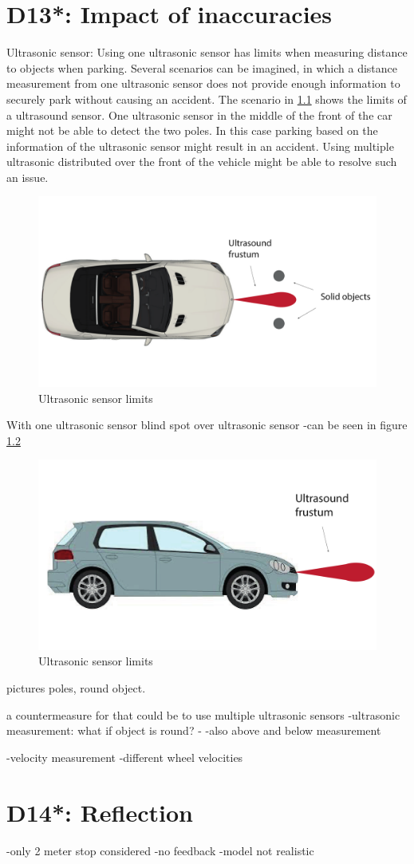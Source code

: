 \chapter{D13*: Impact of inaccuracies}\label{cha:D13}
Ultrasonic sensor:
Using one ultrasonic sensor has limits when measuring distance to objects when parking.
Several scenarios can be imagined, in which a distance measurement from one ultrasonic sensor does not provide enough information to securely park without causing an accident.
The scenario in \ref{fig:D13_USLimitAbove} shows the limits of a ultrasound sensor. One ultrasonic sensor in the middle of the front of the car might not be able to detect the two poles. In this case parking based on the information of the ultrasonic sensor might result in an accident.
Using multiple ultrasonic distributed over the front of the vehicle might be able to resolve such an issue.
\begin{figure}[H]
\centering
\includegraphics[width=.7\textwidth]{images/us_drawing.pdf}
\caption{Ultrasonic sensor limits}
\label{fig:D13_USLimitAbove}
\end{figure}
With one ultrasonic sensor blind spot over ultrasonic sensor
-can be seen in figure \ref{fig:D13_USLimitSide}

\begin{figure}[H]
\centering
\includegraphics[width=.7\textwidth]{images/us_drawing2.pdf}
\caption{Ultrasonic sensor limits}
\label{fig:D13_USLimitSide}
\end{figure}
pictures poles, round object.

a countermeasure for that could be to use multiple ultrasonic sensors 
-ultrasonic measurement: what if object is round?
-
-also above and below measurement

-velocity measurement
-different wheel velocities
\chapter{D14*: Reflection}\label{cha:D14}
-only 2 meter stop considered
-no feedback
-model not realistic
